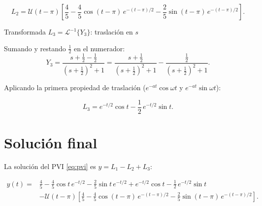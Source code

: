 \documentclass[12pt, a4paper]{article}
\newcommand{\ILap}{\mathcal{L}^{-1}}       %
\newcommand{\Uu}{\mathcal{U}}              %
\newcommand{\half}{\tfrac{1}{2}}
\begin{document}
\begin{resultbox}
\[
  L_2 = \Uu(t-\pi)\!\left[
      \frac{4}{5}
    - \frac{4}{5}\cos(t-\pi)\,e^{-(t-\pi)/2}
    - \frac{2}{5}\sin(t-\pi)\,e^{-(t-\pi)/2}
  \right].
\]
\end{resultbox}

\bigskip

\begin{stepbox}{Transformada $L_3 = \ILap\{Y_3\}$: traslación en $s$}

Sumando y restando $\half$ en el numerador:
\[
  Y_3 = \frac{s + \half - \half}{\left(s+\half\right)^{2}+1}
      = \frac{s + \half}{\left(s+\half\right)^{2}+1}
        - \frac{\half}{\left(s+\half\right)^{2}+1}.
\]

Aplicando la primera propiedad de traslación ($e^{-at}\cos\omega t$ y $e^{-at}\sin\omega t$):
\end{stepbox}

\begin{resultbox}
\[
  L_3 = e^{-t/2}\cos t - \frac{1}{2}\,e^{-t/2}\sin t.
\]
\end{resultbox}

\section{Solución final}

La solución del PVI \eqref{eq:pvi} es $y = L_1 - L_2 + L_3$:

\begin{tcolorbox}[enhanced, colback=green!6!white, colframe=green!50!black,
                  fonttitle=\bfseries, title=Solución $y(t)$]
\begin{align*}
  y(t) ={}&
    \frac{4}{5}
    - \frac{4}{5}\cos t\,e^{-t/2}
    - \frac{2}{5}\sin t\,e^{-t/2}
    + e^{-t/2}\cos t
    - \frac{1}{2}\,e^{-t/2}\sin t \\[6pt]
    &- \Uu(t-\pi)\!\left[
        \frac{4}{5}
        - \frac{4}{5}\cos(t-\pi)\,e^{-(t-\pi)/2}
        - \frac{2}{5}\sin(t-\pi)\,e^{-(t-\pi)/2}
      \right].
\end{align*}
\end{tcolorbox}
\end{document}
